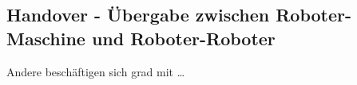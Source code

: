 \subsection{Handover - Übergabe zwischen Roboter-Maschine und Roboter-Roboter}
\label{sec:relatedwork-peis}
    
    Andere beschäftigen sich grad mit \ldots


